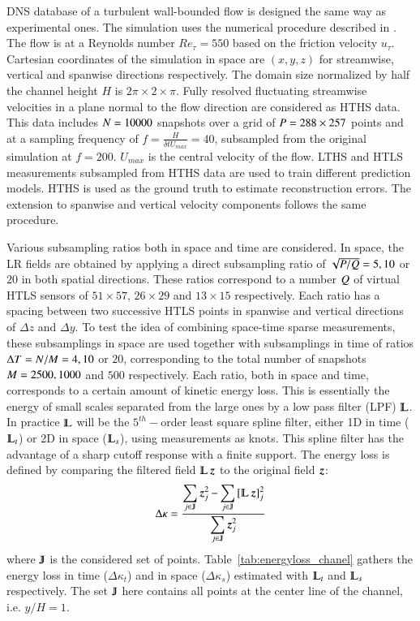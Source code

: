 DNS database of a turbulent wall-bounded flow is designed the same way as experimental ones. The simulation uses the numerical procedure described in \cite{marquillie2008direct}.
The flow is at a Reynolds number $ Re_{\tau}=550 $ based on the friction velocity $ u_{\tau} $. Cartesian coordinates of the simulation in space are $ (x,y,z) $ for streamwise, vertical and spanwise directions respectively. The domain size normalized by half the channel height $ H $ is $ 2\pi \times 2 \times \pi $. Fully resolved fluctuating streamwise velocities in a plane normal to the flow direction are considered as HTHS data. This data includes $ N=10000 $ snapshots over a grid of $ P = 288 \times 257 $ points and at a sampling frequency of $ f=\frac{H}{\delta t U_{max}} = 40 $, subsampled from the original simulation at $ f = 200  $. $ U_{max} $ is the central velocity of the flow. LTHS and HTLS measurements subsampled from HTHS data are used to train different prediction models. HTHS is used as the ground truth to estimate reconstruction errors. The extension to spanwise and vertical velocity components follows the same procedure.

Various subsampling ratios both in space and time are considered. In space, the LR fields are obtained by applying a direct subsampling ratio of $ \sqrt{P /Q } = 5, 10 $ or $ 20 $ in both spatial directions. These ratios correspond to a number $ Q  $ of virtual HTLS sensors of $ 51 \times 57 $, $ 26 \times 29 $ and $ 13 \times 15 $ respectively. Each ratio has a spacing between two successive HTLS points in spanwise and vertical directions of $ \Delta z $ and $ \Delta y $. To test the idea of combining space-time sparse measurements, these subsamplings in space are used together with subsamplings in time of ratios $ \Delta T = N/M = 4, 10$ or $ 20 $, corresponding to the total number of snapshots $ M  = 2500, 1000 $ and $500 $ respectively. Each ratio, both in space and time, corresponds to a certain amount of kinetic energy loss. This is essentially the energy of small scales separated from the large ones by a low pass filter (LPF) $ \LPF $. In practice $ \LPF $ will be the $ 5^{th}-$order least square spline filter, either 1D in time ($ \LPF_t $) or 2D in space ($ \LPF_s $), using measurements as knots. This spline filter has the advantage of a sharp cutoff response with a finite support. The energy loss is defined by comparing the filtered field $ \LPF\z  $ to the original field $ \operatorname{\boldsymbol{z}}  $: 
\begin{equation}
	\Delta\kappa=\frac{\displaystyle \sum\limits_{j\in \varmathbb{J}} \z _j^2-\sum\limits_{j\in \varmathbb{J}}{[\LPF\z ]_j^2}}{\displaystyle \sum\limits_{j\in \varmathbb{J}}\z _j^2}
	\label{eq:RMS_losses}
\end{equation} 
where $ \varmathbb{J}$ is the considered set of points. Table~\ref{tab:energyloss_chanel} gathers the energy loss in time ($ \Delta\kappa_t $) and in space ($ \Delta\kappa_s $) estimated with $ \LPF_t $ and $ \LPF_s $ respectively. The set $ \varmathbb{J}$ here contains all points at the center line of the channel, i.e. $ y/H=1 $.

